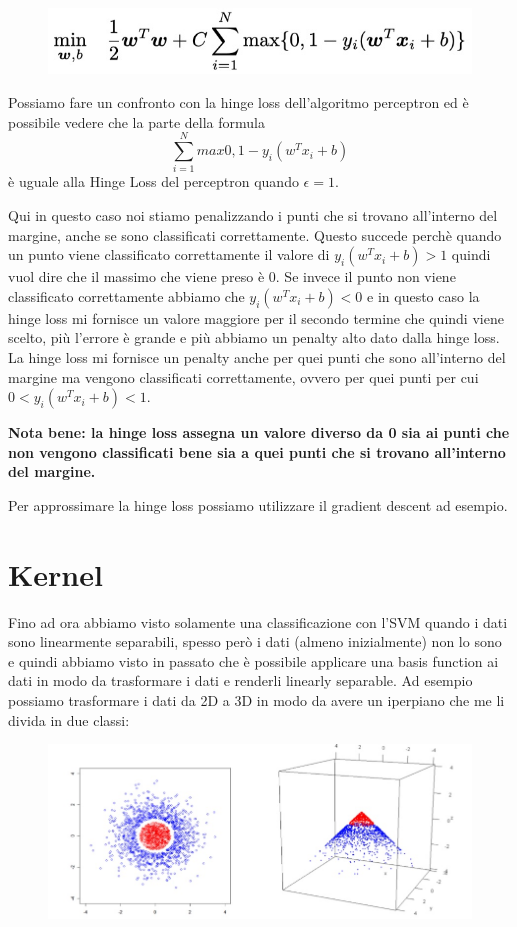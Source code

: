 \documentclass[14pt]{extreport}
\begin{document}
\begin{figure}[H]
\centering
\includegraphics[width=0.7\linewidth]{328.jpeg}
\end{figure}

Possiamo fare un confronto con la hinge loss dell'algoritmo perceptron ed è possibile vedere che la parte della formula $$\sum_{i=1}^N max{0,
1-y_i(w^Tx_i+b)}$$ è uguale alla Hinge Loss del perceptron quando $\epsilon = 1$.

Qui in questo caso noi stiamo penalizzando i punti che si trovano all'interno del margine, anche se sono classificati correttamente. Questo succede
perchè quando un punto viene classificato correttamente il valore di $y_i(w^Tx_i+b) > 1$ quindi vuol dire che il massimo che viene preso è 0. Se
invece il punto non viene classificato correttamente abbiamo che $y_i(w^Tx_i+b)<0$ e in questo caso la hinge loss mi fornisce un valore maggiore per
il secondo termine che quindi viene scelto, più l'errore è grande e più abbiamo un penalty alto dato dalla hinge loss. La hinge loss mi fornisce un
penalty anche per quei punti che sono all'interno del margine ma vengono classificati correttamente, ovvero per quei punti per cui
$0<y_i(w^Tx_i+b)<1$.

\textbf{Nota bene: la hinge loss assegna un valore diverso da 0 sia ai punti che non vengono classificati bene sia a quei punti che si trovano all'interno del margine.}

Per approssimare la hinge loss possiamo utilizzare il gradient descent ad esempio.

\section{Kernel}

Fino ad ora abbiamo visto solamente una classificazione con l'SVM quando i dati sono linearmente separabili, spesso però i dati (almeno inizialmente)
non lo sono e quindi abbiamo visto in passato che è possibile applicare una basis function ai dati in modo da trasformare i dati e renderli linearly
separable. Ad esempio possiamo trasformare i dati da 2D a 3D in modo da avere un iperpiano che me li divida in due classi:

\begin{figure}[H]
\centering
\includegraphics[width=0.5\linewidth]{332.jpeg}
\end{figure}
\end{document}
